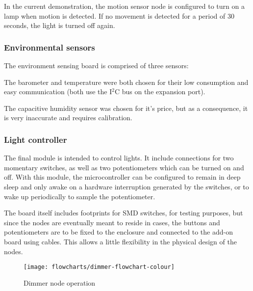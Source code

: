 
In the current demonstration, the motion sensor node is configured to turn on a
lamp when motion is detected. If no movement is detected for a period of 30
seconds, the light is turned off again.


\subsubsection{Environmental sensors}

The environment sensing board is comprised of three sensors:



The barometer and temperature were both chosen for their low consumption and
easy communication (both use the I$^{2}$C bus on the expansion port).

The capacitive humidity sensor was chosen for it's price, but as a consequence,
it is very inaccurate and requires calibration.

\subsubsection{Light controller}

The final module is intended to control lights. It include connections for two
momentary switches, as well as two potentiometers which can be turned on and
off. With this module, the microcontroller can be configured to remain in deep
sleep and only awake on a hardware interruption generated by the switches, or to
wake up periodically to sample the potentiometer.

The board itself includes footprints for SMD switches, for testing purposes, but
since the nodes are eventually meant to reside in cases, the buttons and
potentiometers are to be fixed to the enclosure and connected to the add-on
board using cables. This allows a little flexibility in the physical design of
the nodes.

\begin{figure}[!h]
  \begin{center}
    \texttt{[image: flowcharts/dimmer-flowchart-colour]}
  \end{center}
  \caption{Dimmer node operation}
  \label{fig:dimmer-flowchart}
\end{figure}

